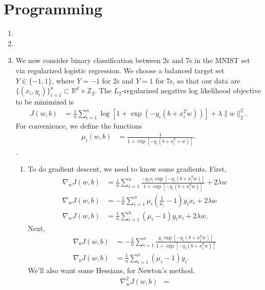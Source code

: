 \documentclass[11pt,letterpaper]{article}
\numberwithin{equation}{section}
\numberwithin{figure}{section}
\begin{document}
\section{Programming}
\begin{enumerate}
	\item 












	\item



















	\item We now consider binary classification between 2s and 7s in the MNIST set via regularized logistic regression. We choose a balanced target set $Y \in \{-1,1\}$, where $Y=-1$ for 2s and $Y = 1$ for 7s, so that our data are $\{(x_i,y_i)\}_{i=1}^n \subset \mathbb{R}^d \times \mathbb{Z}_2$. The $L_2$-regularized negative log likelihood objective to be minimized is
	\begin{align*}
		J(w,b) &= \frac{1}{n} \sum_{i=1}^n \log\left[1 + \exp\left(-y_i(b+x_i^T w)\right)\right] + \lambda \|w\|_2^2.
	\end{align*}
	For convenience, we define the functions
	\begin{align*}
		\mu_i(w,b) &= \frac{1}{1+\exp\left[-y_i(b+x_i^T + w)\right]}.
	\end{align*}.
	\begin{enumerate}
		\item To do gradient descent, we need to know some gradients. First,
		\begin{align*}
			\nabla_w J(w,b) &= \frac{1}{n} \sum_{i=1}^n \frac{-y_i x_i \exp\left[-y_i(b + x_i^T w)\right]}{1 + \exp\left[-y_i(b+x_i^T w)\right]} + 2\lambda w\\
			\nabla_w J(w,b) &= -\frac{1}{n} \sum_{i=1}^n \mu_i \left(\frac{1}{\mu_i} - 1\right) y_i x_i + 2\lambda w\\
			\nabla_w J(w,b) &= \frac{1}{n} \sum_{i=1}^n (\mu_i - 1) y_i x_i + 2\lambda w.
		\end{align*}
		Next,
		\begin{align*}
			\nabla_b J(w,b) &= -\frac{1}{n} \sum_{i=1}^n \frac{y_i \exp\left[-y_i(b + x_i^T w)\right]}{1+\exp\left[-y_i(b+x_i^T w)\right]}\\
			\nabla_b J(w,b) &= \frac{1}{n} \sum_{i=1}^n (\mu_i -1) y_i.
		\end{align*}
		We'll also want some Hessians, for Newton's method.
		\begin{align*}
			\nabla^2_w J(w,b) &= 
		\end{align*}
	\end{enumerate}
\end{enumerate}
\end{document}
